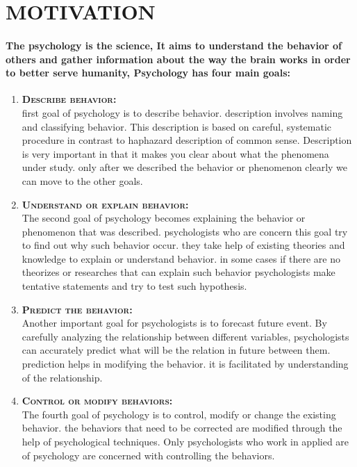 \documentclass[../Psychological_system_web_application.tex]{subfiles}
\begin{document}
	
		\section{MOTIVATION}
		
			\paragraph{The \gls{psychology} is the science, It aims to understand the \gls{behavior} of others and gather information about the way the brain works in order to better serve humanity, Psychology has four main goals:}
				\begin{enumerate}
					\item
						\textsc{\textbf{\color{red} Describe behavior:}}\\
							first goal of \gls{psychology} is to describe \gls{behavior}. description involves naming and classifying \gls{behavior}. This description is based on careful, systematic procedure in contrast to haphazard description of common sense. Description is very important in that it makes you clear about what the \gls{phenomena} under study. only after we described the \gls{behavior} or phenomenon clearly we can move to the other goals.
						\item
							\textsc{\textbf{\color{red} Understand or explain behavior:}}\\
								The second goal of psychology becomes explaining the \gls{behavior} or phenomenon that was described. \gls{psychologist}s who are concern this goal try to find out why such behavior occur. they take help of existing theories and knowledge to explain or understand behavior. in some cases if there are no theorizes or researches that can explain such behavior psychologists make tentative statements and try to test such hypothesis.
						\item
							\textsc{\textbf{\color{red} Predict the behavior:}}\\
								Another important goal for \gls{psychologist}s is to forecast future event. By carefully analyzing the relationship between different variables, psychologists can accurately predict what will be the relation in future between them. prediction helps in modifying the behavior. it is facilitated by understanding of the relationship.
						\item
							\textsc{\textbf{\color{red} Control or modify behaviors:}}\\
								The fourth goal of \gls{psychology} is to control, modify or change the existing behavior. the \gls{behavior}s that need to be corrected are modified through the help of psychological techniques. Only \gls{psychologist}s who work in applied are of psychology are concerned with controlling the behaviors. 
				\end{enumerate}
			
\end{document}
